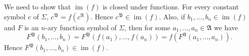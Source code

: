 \documentclass[12pt]{article}
\newcommand{\A}{\mathfrak{A}}
\newcommand{\B}{\mathfrak{B}}
\DeclareMathOperator{\im}{im}
\begin{document}
We need to show that $\im(f)$ is closed under functions. For every constant symbol $c$ of $\Sigma$, \(c^\B = f(c^\A)\). Hence \(c^\B \in \im(f)\). Also, if \(b_1, \ldots, b_n \in \im(f)\) and $F$ is an $n$-ary function symbol of $\Sigma$, then for some \(a_1, \ldots, a_n \in \A\) we have
\[
F^\B(b_1, \ldots, b_n) = F^\B(f(a_1), \ldots, f(a_n)) = f(F^\A(a_1, \ldots, a_n)).
\]
Hence \(F^\B(b_1, \ldots, b_n) \in \im(f)\).
\end{document}
